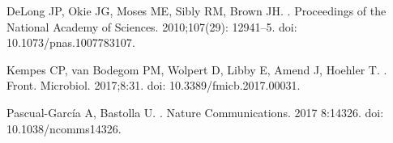 \documentclass[10pt,letterpaper]{article}
\begin{document}
\begin{thebibliography}{10}
DeLong JP, Okie JG, Moses ME, Sibly RM, Brown JH.
.
\newblock Proceedings of the National Academy of Sciences. 2010;107(29): 12941--5.
\newblock doi: {10.1073/pnas.1007783107}.

Kempes CP, van Bodegom PM, Wolpert D, Libby E, Amend J, Hoehler T.
.
\newblock Front. Microbiol. 2017;8:31.
\newblock doi: {10.3389/fmicb.2017.00031}.

Pascual-Garc{\'{i}}a A, Bastolla U.
.
\newblock Nature Communications. 2017 8:14326.
\newblock doi: {10.1038/ncomms14326}.








\end{thebibliography}
\end{document}
